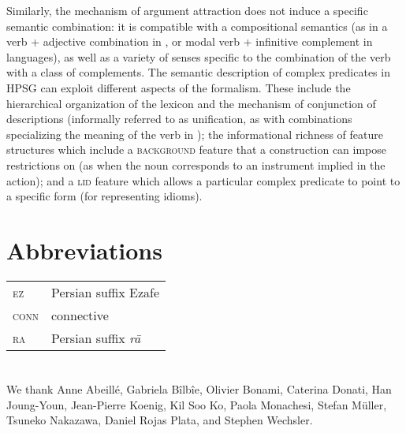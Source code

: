 Similarly, the mechanism of argument attraction does not induce a specific semantic combination: it
is compatible with a compositional semantics (as in a verb + adjective combination in , or
modal verb + infinitive complement in  languages), as well as a variety of senses specific to
the combination of the verb with a class of complements. 
The semantic description of complex predicates in HPSG can exploit different aspects of the formalism.
These include the hierarchical organization of the lexicon and the mechanism of conjunction of descriptions (informally referred to as unification, as with combinations specializing the meaning of the verb in ); the informational richness of feature structures which include a \textsc{background} feature that a construction can impose restrictions on (as when the noun corresponds to an instrument implied in the action); and a \textsc{lid} feature which allows a particular complex predicate to point to a specific form (for representing idioms).    


\section*{Abbreviations}


\begin{tabularx}{.99\textwidth}{@{}lX}
\textsc{ez} & Persian suffix Ezafe \\
\textsc{conn} & connective\\
\textsc{ra} & Persian suffix \emph{rā}\\
\end{tabularx}




\section*{\acknowledgmentsUS}

We thank Anne Abeill\'e, Gabriela B\^ilb\^ie, Olivier Bonami, Caterina Donati, Han Joung-Youn, Jean-Pierre Koenig, Kil Soo Ko, Paola Monachesi, Stefan Müller, Tsuneko Nakazawa, Daniel Rojas Plata, and Stephen Wechsler. 

{\sloppy
	\printbibliography[heading=subbibliography,notkeyword=this]
}


